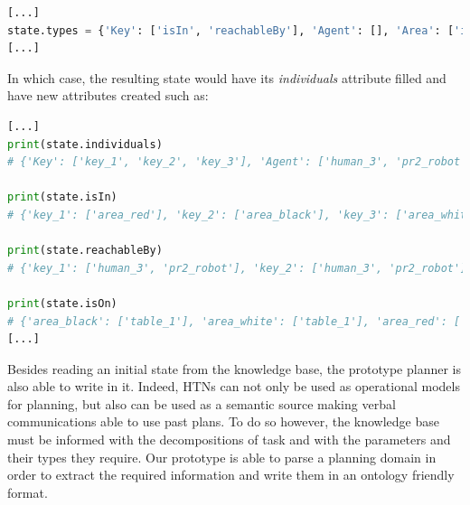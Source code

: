 \documentclass[a4paper,11pt,twoside]{StyleThese}
\begin{document}

\begin{lstlisting}[language=Python]
[...]
state.types = {'Key': ['isIn', 'reachableBy'], 'Agent': [], 'Area': ['isOn']}
[...]
\end{lstlisting}
In which case, the resulting state would have its \textit{individuals} attribute filled and have new attributes created such as:


\begin{lstlisting}[language=Python]
[...]
print(state.individuals)
# {'Key': ['key_1', 'key_2', 'key_3'], 'Agent': ['human_3', 'pr2_robot'], 'Area': ['area_black', 'area_white', 'area_red'], 'Table': ['table_1']}

print(state.isIn)
# {'key_1': ['area_red'], 'key_2': ['area_black'], 'key_3': ['area_white']}

print(state.reachableBy)
# {'key_1': ['human_3', 'pr2_robot'], 'key_2': ['human_3', 'pr2_robot'], 'key_3': ['human_3', 'pr2_robot']}

print(state.isOn)
# {'area_black': ['table_1'], 'area_white': ['table_1'], 'area_red': ['table_1']}
[...]
\end{lstlisting}


Besides reading an initial state from the knowledge base, the prototype planner is also able to write in it. Indeed, HTNs can not only be used as operational models for planning, but also can be used as a semantic source making verbal communications able to use past plans. To do so however, the knowledge base must be informed with the decompositions of task and with the parameters and their types they require. Our prototype is able to parse a planning domain in order to extract the required information and write them in an ontology friendly format.
\end{document}
